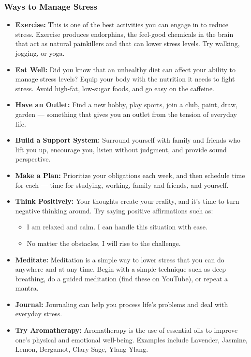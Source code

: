 \documentclass[a4paper,12pt]{article}
\begin{document}
\subsubsection*{Ways to Manage Stress}
\begin{itemize}
    \item \textbf{Exercise:} This is one of the best activities you can engage in to reduce stress. Exercise produces endorphins, the feel-good chemicals in the brain that act as natural painkillers and that can lower stress levels. Try walking, jogging, or yoga.
    \item \textbf{Eat Well:} Did you know that an unhealthy diet can affect your ability to manage stress levels? Equip your body with the nutrition it needs to fight stress. Avoid high-fat, low-sugar foods, and go easy on the caffeine.
    \item \textbf{Have an Outlet:} Find a new hobby, play sports, join a club, paint, draw, garden — something that gives you an outlet from the tension of everyday life.
    \item \textbf{Build a Support System:} Surround yourself with family and friends who lift you up, encourage you, listen without judgment, and provide sound perspective.
    \item \textbf{Make a Plan:} Prioritize your obligations each week, and then schedule time for each — time for studying, working, family and friends, and yourself.
    \item \textbf{Think Positively:} Your thoughts create your reality, and it's time to turn negative thinking around. Try saying positive affirmations such as:
    \begin{itemize}
        \item I am relaxed and calm. I can handle this situation with ease.
        \item No matter the obstacles, I will rise to the challenge.
    \end{itemize}
    \item \textbf{Meditate:} Meditation is a simple way to lower stress that you can do anywhere and at any time. Begin with a simple technique such as deep breathing, do a guided meditation (find these on YouTube), or repeat a mantra.
    \item \textbf{Journal:} Journaling can help you process life's problems and deal with everyday stress.
    \item \textbf{Try Aromatherapy:} Aromatherapy is the use of essential oils to improve one's physical and emotional well-being. Examples include Lavender, Jasmine, Lemon, Bergamot, Clary Sage, Ylang Ylang.
\end{itemize}
\end{document}

